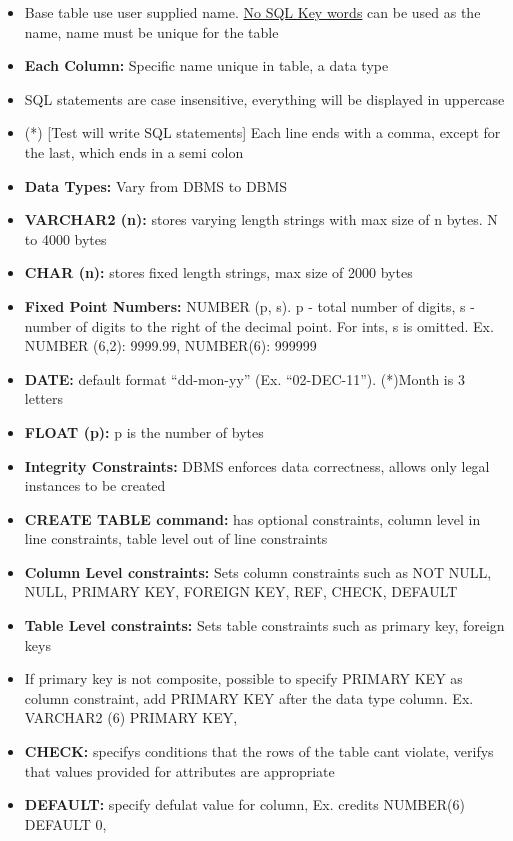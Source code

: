 \documentclass[12pt]{article}
\begin{document}
\begin{itemize}
		\item Base table use user supplied name. \underline{No SQL Key words} can be used as the name, name
			must be unique for the table
		\item \textbf{Each Column:} Specific name unique in table, a data type
		\item SQL statements are case insensitive, everything will be displayed in uppercase
		\item (*) [Test will write SQL statements] Each line ends with a comma, except for the last, 
			which ends in a semi colon
		\item \textbf{Data Types:} Vary from DBMS to DBMS
		\item \textbf{VARCHAR2 (n):} stores varying length strings with max size of n bytes. N to 4000 bytes
		\item \textbf{CHAR (n):} stores fixed length strings, max size of 2000 bytes
		\item \textbf{Fixed Point Numbers:} NUMBER (p, s). p - total number of digits, s - number of digits to
	  		the right of the decimal point. For ints, s is omitted. Ex. NUMBER (6,2): 9999.99,
			NUMBER(6): 999999	
		\item \textbf{DATE:} default format ``dd-mon-yy'' (Ex. ``02-DEC-11''). (*)Month is 3 letters 
		\item \textbf{FLOAT (p):} p is the number of bytes  
		\item \textbf{Integrity Constraints:} DBMS enforces data correctness, allows only legal instances to be
	  		created	
		\item \textbf{CREATE TABLE command:} has optional constraints, column level in line constraints,
	  		table level out of line constraints	
		\item \textbf{Column Level constraints:} Sets column constraints such as NOT NULL, NULL, PRIMARY KEY,
			FOREIGN KEY, REF, CHECK, DEFAULT
		\item \textbf{Table Level constraints:} Sets table constraints such as primary key, foreign keys 
		\item If primary key is not composite, possible to specify PRIMARY KEY as column constraint, add
	  		PRIMARY KEY after the data type column. Ex. VARCHAR2 (6) PRIMARY KEY,	
		\item \textbf{CHECK:} specifys conditions that the rows of the table cant violate, verifys that
  			values provided for attributes are appropriate		
		\item \textbf{DEFAULT:} specify defulat value for column, Ex. credits NUMBER(6) DEFAULT 0, 

\end{itemize}
\end{document}
